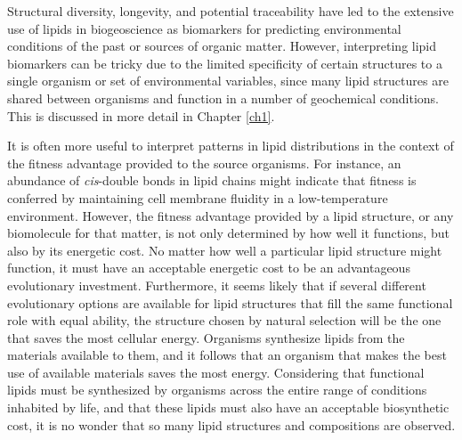 Structural diversity, longevity, and potential traceability have led to the extensive use of lipids in biogeoscience as biomarkers for predicting environmental conditions of the past or sources of organic matter. However, interpreting lipid biomarkers can be tricky due to the limited specificity of certain structures to a single organism or set of environmental variables, since many lipid structures are shared between organisms and function in a number of geochemical conditions. This is discussed in more detail in Chapter \ref{ch1}.

It is often more useful to interpret patterns in lipid distributions in the context of the fitness advantage provided to the source organisms. For instance, an abundance of \textit{cis}-double bonds in lipid chains might indicate that fitness is conferred by maintaining cell membrane fluidity in a low-temperature environment. However, the fitness advantage provided by a lipid structure, or any biomolecule for that matter, is not only determined by how well it functions, but also by its energetic cost. No matter how well a particular lipid structure might function, it must have an acceptable energetic cost to be an advantageous evolutionary investment. Furthermore, it seems likely that if several different evolutionary options are available for lipid structures that fill the same functional role with equal ability, the structure chosen by natural selection will be the one that saves the most cellular energy. Organisms synthesize lipids from the materials available to them, and it follows that an organism that makes the best use of available materials saves the most energy. Considering that functional lipids must be synthesized by organisms across the entire range of conditions inhabited by life, and that these lipids must also have an acceptable biosynthetic cost, it is no wonder that so many lipid structures and compositions are observed. 

